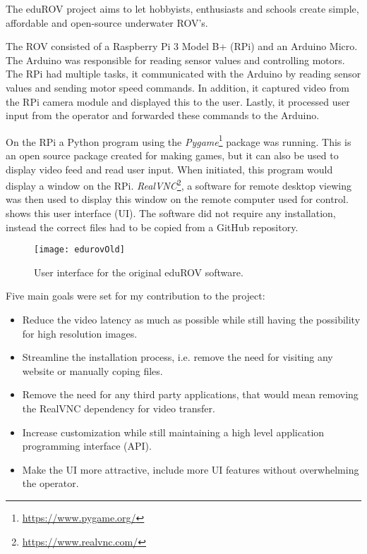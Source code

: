 The eduROV project aims to let hobbyists, enthusiasts and schools create simple, affordable and open-source underwater ROV's. 

The ROV consisted of a Raspberry Pi 3 Model B+ (RPi) and an Arduino Micro. The Arduino was responsible for reading sensor values and controlling motors. The RPi had multiple tasks, it communicated with the Arduino by reading sensor values and sending motor speed commands. In addition, it captured video from the RPi camera module and displayed this to the user. Lastly, it processed user input from the operator and forwarded these commands to the Arduino.

On the RPi a Python program using the \emph{Pygame}\footnote{\url{https://www.pygame.org/}} package was running. This is an open source package created for making games, but it can also be used to display video feed and read user input. When initiated, this program would display a window on the RPi. \emph{RealVNC}\footnote{\url{https://www.realvnc.com/}}, a software for remote desktop viewing was then used to display this window on the remote computer used for control.  shows this user interface (UI). The software did not require any installation, instead the correct files had to be copied from a GitHub repository.

\begin{figure}[h!]
    \centering
    \texttt{[image: edurovOld]}
    \caption{User interface for the original eduROV software.}
    \label{edurovOld}
\end{figure}

Five main goals were set for my contribution to the project:

\begin{itemize}
\item Reduce the video latency as much as possible while still having the possibility for high resolution images.

\item Streamline the installation process, i.e. remove the need for visiting any website or manually coping files.

\item Remove the need for any third party applications, that would mean removing the RealVNC dependency for video transfer.

\item Increase customization while still maintaining a high level application programming interface (API).

\item Make the UI more attractive, include more UI features without overwhelming the operator.
\end{itemize}

